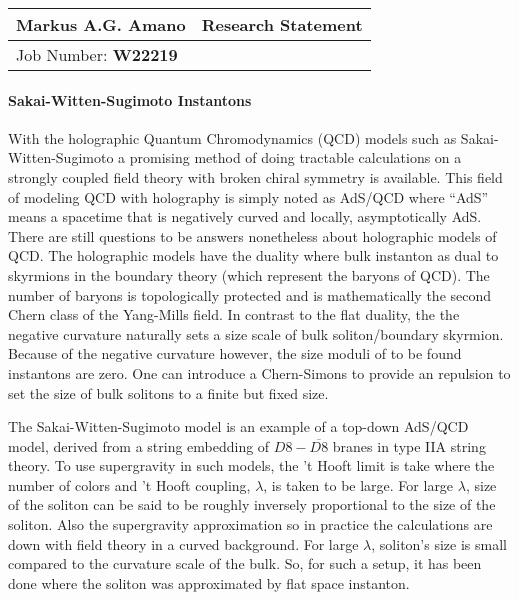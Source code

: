 \documentclass[12pt]{article}
\begin{document}
\begin{center}
  \begin{tabularx}{\textwidth} { 
      >{\raggedright\arraybackslash}X 
    >{\raggedleft\arraybackslash}X  }
    \huge Markus A.G. Amano & Research Statement\\
    \hline
    Job Number: \textbf{W22219} & \\
  \end{tabularx}
\end{center}

\paragraph{Sakai-Witten-Sugimoto Instantons}
With the holographic Quantum Chromodynamics (QCD) models such as Sakai-Witten-Sugimoto a promising method of doing tractable calculations on a strongly coupled field theory with broken chiral symmetry is available.
%
This field of modeling QCD with holography is simply noted as AdS/QCD where ``AdS'' means a spacetime that is negatively curved and locally, asymptotically AdS.
%
There are still questions to be answers nonetheless about holographic models of QCD.
%
The holographic models have the duality where bulk instanton as dual to skyrmions in the boundary theory (which represent the baryons of QCD).
%
The number of baryons is topologically protected and is mathematically the second Chern class of the Yang-Mills field.
%
In contrast to the flat duality, the the negative curvature naturally sets a size scale of bulk soliton/boundary skyrmion.
%
Because of the negative curvature however, the size moduli of to be found instantons are zero.
%
One can introduce a Chern-Simons to provide an repulsion to set the size of bulk solitons to a finite but fixed size.

The Sakai-Witten-Sugimoto model is an example of a top-down AdS/QCD model, derived from a string embedding of $D8-\overline{D8}$ branes in type IIA string theory.
%
To use supergravity in such models, the 't Hooft limit is take where the number of colors and 't Hooft coupling, $\lambda$, is taken to be large.
%
For large $\lambda$, size of the soliton can be said to be roughly inversely proportional to the size of the soliton.
%
Also the supergravity approximation so in practice the calculations are down with field theory in a curved background.
%
For large $\lambda$, soliton's size is small compared to the curvature scale of the bulk. 
%
So, for such a setup, it has been done where the soliton was approximated by flat space instanton.
\end{document}
